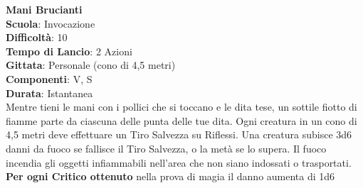 \begin{multicols}{2}
\medskip\textbf{Mani Brucianti}\\
\textbf{Scuola}: Invocazione\\
\textbf{Difficoltà}:  10\\
\textbf{Tempo di Lancio}: 2 Azioni\\
\textbf{Gittata}: Personale (cono di 4,5 metri)\\
\textbf{Componenti}: V, S\\
\textbf{Durata}: Istantanea\\
Mentre tieni le mani con i pollici che si toccano e le dita tese, un sottile fiotto di fiamme parte da ciascuna delle punta delle tue dita. Ogni creatura in un cono di 4,5 metri deve effettuare un Tiro Salvezza su Riflessi. Una creatura subisce 3d6 danni da fuoco se fallisce il Tiro Salvezza, o la metà se lo supera. Il fuoco incendia gli oggetti infiammabili nell'area che non siano indossati o trasportati.\\
\textbf{Per ogni Critico ottenuto} nella prova di magia il danno aumenta di 1d6


\end{multicols}
